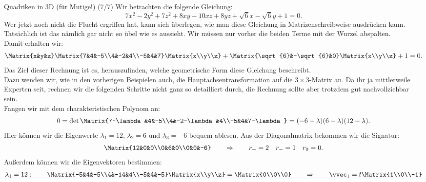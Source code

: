 \begin{Beispiel}
    {Quadriken in 3D (für Mutige!) (7/7)}
    Wir betrachten die folgende Gleichung:
    \begin{equation*}
        7x^2-2y^2+7z^2+8xy-10xz+8yz+\sqrt{6}x-\sqrt{6}y+1=0.
    \end{equation*}
    Wer jetzt noch nicht die Flucht ergriffen hat, kann sich überlegen, wie man diese Gleichung in Matrizenschreibweise ausdrücken kann. Tatsächlich ist das nämlich gar nicht so übel wie es aussieht. Wir müssen nur vorher die beiden Terme mit der Wurzel abspalten.\\
    Damit erhalten wir:
    \begin{equation*}
        \Matrix{x&y&z}\Matrix{7&4&-5\\4&-2&4\\-5&4&7}\Matrix{x\\y\\z} + \Matrix{\sqrt{6}&-\sqrt{6}&0}\Matrix{x\\y\\z} + 1 = 0.
    \end{equation*}
    Das Ziel dieser Rechnung ist es, herauszufinden, welche geometrische Form diese Gleichung beschreibt.\\
    Dazu wenden wir, wie in den vorherigen Beispielen auch, die Hauptachsentransformation auf die $3\times3$-Matrix an. Da ihr ja mittlerweile Experten seit, rechnen wir die folgenden Schritte nicht ganz so detailliert durch, die Rechnung sollte aber trotzdem gut nachvollziehbar sein.\\
    Fangen wir mit dem charakteristischen Polynom an:
    \begin{equation*}
        0=\det\Matrix{7-\lambda&4&-5\\4&-2-\lambda&4\\-5&4&7-\lambda}=(-6-\lambda)(6-\lambda)(12-\lambda).
    \end{equation*}
    Hier können wir die Eigenwerte $\lambda_1=12$, $\lambda_2=6$ und $\lambda_3=-6$ bequem ablesen. Aus der Diagonalmatrix bekommen wir die Signatur:
    \begin{equation*}
        \Matrix{12&0&0\\0&6&0\\0&0&-6} \qquad \Rightarrow \qquad r_+=2 \quad r_-=1 \quad r_0=0.
    \end{equation*}
    Außerdem können wir die Eigenvektoren bestimmen:
    \begin{align*}
        \lambda_1&=12: \qquad \Matrix{-5&4&-5\\4&-14&4\\-5&4&-5}\Matrix{x\\y\\z}=\Matrix{0\\0\\0} \qquad \Rightarrow \qquad \vvec_1=t\Matrix{1\\0\\-1} \\

\end{align*}
\end{Beispiel}
